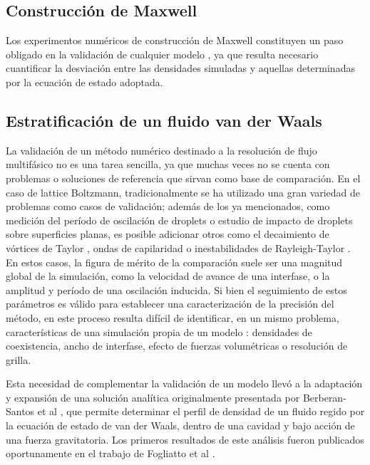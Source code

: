 \subsection{Construcci\'on de Maxwell}

Los experimentos num\'ericos de construcci\'on de Maxwell constituyen un paso obligado en la validaci\'on de cualquier modelo \pp{}, ya que resulta necesario cuantificar la desviaci\'on entre las densidades simuladas y aquellas determinadas por la ecuaci\'on de estado adoptada. 



\subsection{Estratificaci\'on de un fluido van der Waals}

La validaci\'on de un m\'etodo num\'erico destinado a la resoluci\'on de flujo multif\'asico no es una tarea sencilla, ya que muchas veces no se cuenta con problemas o soluciones de referencia que sirvan como base de comparaci\'on. En el caso de lattice Boltzmann, tradicionalmente se ha utilizado una gran variedad de problemas como casos de validaci\'on; adem\'as de los ya mencionados, como medici\'on del per\'iodo de oscilaci\'on de droplets o estudio de impacto de droplets sobre superficies planas, es posible adicionar otros como el decaimiento de v\'ortices de Taylor \cite{guo_discrete_2002}, ondas de capilaridad \cite{mccracken_multiple-relaxation-time_2005} o inestabilidades de Rayleigh-Taylor \cite{li_additional_2012}. En estos casos, la figura de m\'erito de la comparaci\'on suele ser una magnitud global de la simulaci\'on, como la velocidad de avance de una interfase, o la amplitud y per\'iodo de una oscilaci\'on inducida. Si bien el seguimiento de estos par\'ametros es v\'alido para establecer una caracterizaci\'on de la precisi\'on del m\'etodo, en este proceso resulta dif\'icil de identificar, en un mismo problema, caracter\'isticas de una simulaci\'on propia de un modelo \pp{}: densidades de coexistencia, ancho de interfase, efecto de fuerzas volum\'etricas o resoluci\'on de grilla.

Esta necesidad de complementar la validaci\'on de un modelo \pp{} llev\'o a la adaptaci\'on y expansi\'on de una soluci\'on anal\'itica originalmente presentada por Berberan-Santos et al \cite{berberan-santos_liquidvapor_2002}, que permite determinar el perfil de densidad de un fluido regido por la ecuaci\'on de estado de van der Waals, dentro de una cavidad y bajo acci\'on de una fuerza gravitatoria.  Los primeros resultados de este an\'alisis fueron publicados oportunamente en el trabajo de Fogliatto et al \cite{fogliatto_simulation_2019}.


